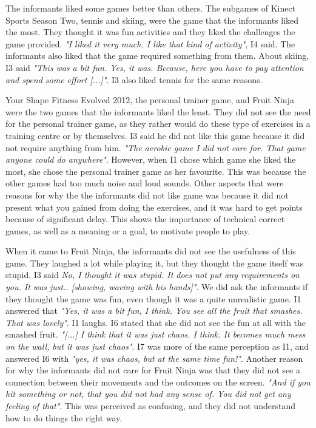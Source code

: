 The informants liked some games better than others. The subgames of Kinect Sports Season Two, tennis and skiing, were the game that the informants liked the most. They thought it was fun activities and they liked the challenges the game provided. \emph{"I liked it very much. I like that kind of activity"}, I4 said. The informants also liked that the game required something from them. About skiing, I3 said \emph{"This was a bit fun. Yes, it was. Because, here you have to pay attention and spend some effort [...]"}. I3 also liked tennis for the same reasons.  

Your Shape Fitness Evolved 2012, the personal trainer game, and Fruit Ninja were the two games that the informants liked the least. They did not see the need for the personal trainer game, as they rather would do these type of exercises in a training centre or by themselves. I3 said he did not like this game because it did not require anything from him. \emph{"The aerobic game I did not care for. That game anyone could do anywhere"}. However, when I1 chose which game she liked the most, she chose the personal trainer game as her favourite. This was because the other games had too much noise and loud sounds. Other aspects that were reasons for why the the informants did not like game was because it did not present what you gained from doing the exercises, and it was hard to get points because of significant delay. This shows the importance of technical correct games, as well as a meaning or a goal, to motivate people to play. 

When it came to Fruit Ninja, the informants did not see the usefulness of this game. They laughed a lot while playing it, but they thought the game itself was stupid. I3 said \emph{No, I thought it was stupid. It does not put any requirements on you. It was just.. [showing, waving with his hands]"}. We did ask the informants if they thought the game was fun, even though it was a quite unrealistic game. I1 answered that \emph{"Yes, it was a bit fun, I think. You see all the fruit that smashes. That was lovely"}. I1 laughs. I6 stated that she did not see the fun at all with the smashed fruit. \emph{"[...] I think that it was just chaos. I think. It becomes much mess on the wall, but it was just chaos"}. I7 was more of the same perception as I1, and answered I6 with \emph{"yes, it was chaos, but at the same time fun!"}. Another reason for why the informants did not care for Fruit Ninja was that they did not see a connection between their movements and the outcomes on the screen. \emph{"And if you hit something or not, that you did not had any sense of. You did not get any feeling of that"}. This was perceived as confusing, and they did not understand how to do things the right way. 


